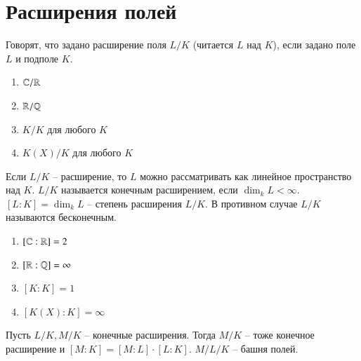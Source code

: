 \documentclass[main]{subfiles}
\begin{document}
\chapter{Расширения полей}


\begin{definition}
    Говорят, что задано расширение поля $L / K$ (читается $L$ над $K$),
     если задано поле $L$ и подполе $K$.
\end{definition}

\begin{example}
    \begin{enumerate}
        \item $\mathbb{C} / \mathbb{R}$
        \item $ \mathbb{R} / \mathbb{Q} $
        \item  $ K / K$ для любого $K$
        \item  $K(X) / K $ для любого $K$
    \end{enumerate}
  
\end{example}

Если $L / K$ -- расширение, то $L$ можно рассматривать как линейное пространство над $K$.
$L / K$ называется конечным расширением, если $\dim_k L < \infty$. 
$[L:K] = \dim_k L $ -- степень расширения $L / K$. В противном случае
$L / K$ называются бесконечным.

\begin{example}
    \begin{enumerate}
        \item $[\mathbb{C}:\mathbb{R}] = 2$
        \item $[\mathbb{R} : \mathbb{Q} ] = \infty$
        \item  $ [K:K] = 1$
        \item $[K(X):K]= \infty $ 
    \end{enumerate}
\end{example}

\begin{proposition}
    Пусть $L / K, M / K$ -- конечные расширения. Тогда $M / K$ -- тоже
    конечное расширение и $[M:K] = [M:L] \cdot [L:K]$.
    $M / L / K $ -- башня полей.
\end{proposition}
\end{document}
